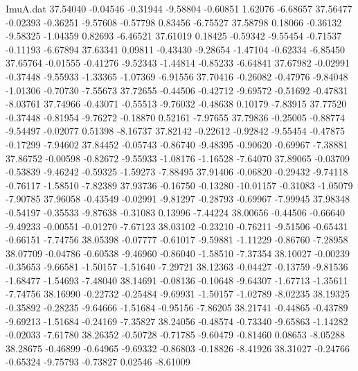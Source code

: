 \begin{filecontents}{ImuA.dat}
  37.54040   -0.04546   -0.31944   -9.58804   -0.60851    1.62076   -6.68657
  37.56477   -0.02393   -0.36251   -9.57608   -0.57798    0.83456   -6.75527
  37.58798    0.18066   -0.36132   -9.58325   -1.04359    0.82693   -6.46521
  37.61019    0.18425   -0.59342   -9.55454   -0.71537   -0.11193   -6.67894
  37.63341    0.09811   -0.43430   -9.28654   -1.47104   -0.62334   -6.85450
  37.65764   -0.01555   -0.41276   -9.52343   -1.44814   -0.85233   -6.64841
  37.67982   -0.02991   -0.37448   -9.55933   -1.33365   -1.07369   -6.91556
  37.70416   -0.26082   -0.47976   -9.84048   -1.01306   -0.70730   -7.55673
  37.72655   -0.44506   -0.42712   -9.69572   -0.51692   -0.47831   -8.03761
  37.74966   -0.43071   -0.55513   -9.76032   -0.48638    0.10179   -7.83915
  37.77520   -0.37448   -0.81954   -9.76272   -0.18870    0.52161   -7.97655
  37.79836   -0.25005   -0.88774   -9.54497   -0.02077    0.51398   -8.16737
  37.82142   -0.22612   -0.92842   -9.55454   -0.47875   -0.17299   -7.94602
  37.84452   -0.05743   -0.86740   -9.48395   -0.90620   -0.69967   -7.38881
  37.86752   -0.00598   -0.82672   -9.55933   -1.08176   -1.16528   -7.64070
  37.89065   -0.03709   -0.53839   -9.46242   -0.59325   -1.59273   -7.88495
  37.91406   -0.06820   -0.29432   -9.74118   -0.76117   -1.58510   -7.82389
  37.93736   -0.16750   -0.13280  -10.01157   -0.31083   -1.05079   -7.90785
  37.96058   -0.43549   -0.02991   -9.81297   -0.28793   -0.69967   -7.99945
  37.98348   -0.54197   -0.35533   -9.87638   -0.31083    0.13996   -7.44224
  38.00656   -0.44506   -0.66640   -9.49233   -0.00551   -0.01270   -7.67123
  38.03102   -0.23210   -0.76211   -9.51506   -0.65431   -0.66151   -7.74756
  38.05398   -0.07777   -0.61017   -9.59881   -1.11229   -0.86760   -7.28958
  38.07709   -0.04786   -0.60538   -9.46960   -0.86040   -1.58510   -7.37354
  38.10027   -0.00239   -0.35653   -9.66581   -1.50157   -1.51640   -7.29721
  38.12363   -0.04427   -0.13759   -9.81536   -1.68477   -1.54693   -7.48040
  38.14691   -0.08136   -0.10648   -9.64307   -1.67713   -1.35611   -7.74756
  38.16990   -0.22732   -0.25484   -9.69931   -1.50157   -1.02789   -8.02235
  38.19325   -0.35892   -0.28235   -9.64666   -1.51684   -0.95156   -7.86205
  38.21741   -0.44865   -0.43789   -9.69213   -1.51684   -0.24169   -7.35827
  38.24056   -0.48574   -0.73340   -9.65863   -1.14282   -0.02033   -7.61780
  38.26352   -0.50728   -0.71785   -9.60479   -0.81460    0.08653   -8.05288
  38.28675   -0.46899   -0.64965   -9.69332   -0.86803   -0.18826   -8.41926
  38.31027   -0.24766   -0.65324   -9.75793   -0.73827    0.02546   -8.61009

\end{filecontents}
